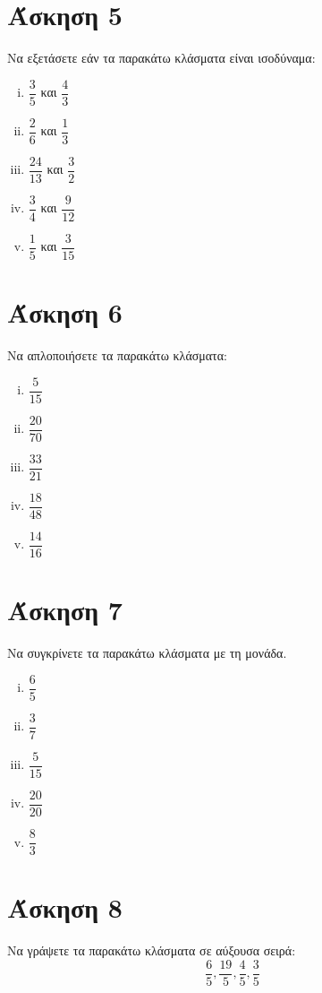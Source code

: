 \documentclass[a4paper,10pt]{report}
\begin{document}
\section*{Άσκηση 5  \hfill \small{}}
Να εξετάσετε εάν τα παρακάτω κλάσματα είναι ισοδύναμα:
\begin{enumerate}[i)]
 \item $\dfrac{3}{5}$ και $\dfrac{4}{3}$
 \item $\dfrac{2}{6}$ και $\dfrac{1}{3}$
 \item $\dfrac{24}{13}$ και $\dfrac{3}{2}$
 \item $\dfrac{3}{4}$ και $\dfrac{9}{12}$
 \item $\dfrac{1}{5}$ και $\dfrac{3}{15}$
\end{enumerate}

\section*{Άσκηση 6  \hfill \small{}}
Να απλοποιήσετε τα παρακάτω κλάσματα:
\begin{enumerate}[i)]
 \item $\dfrac{5}{15}$
 \item $\dfrac{20}{70}$
 \item $\dfrac{33}{21}$
 \item $\dfrac{18}{48}$
 \item $\dfrac{14}{16}$
\end{enumerate}

\section*{Άσκηση 7  \hfill \small{}}
Να συγκρίνετε τα παρακάτω κλάσματα με τη μονάδα.
\begin{enumerate}[i)]
 \item $\dfrac{6}{5}$
 \item $\dfrac{3}{7}$
 \item $\dfrac{5}{15}$
 \item $\dfrac{20}{20}$
 \item $\dfrac{8}{3}$
\end{enumerate}

\section*{Άσκηση 8  \hfill \small{}}
Να γράψετε τα παρακάτω κλάσματα σε αύξουσα σειρά:
$$ \dfrac{6}{5}, \dfrac{19}{5}, \dfrac{4}{5}, \dfrac{3}{5} $$
\end{document}
